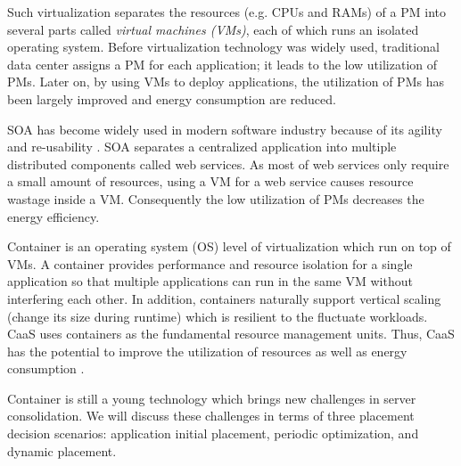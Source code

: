  Such virtualization separates the resources (e.g. CPUs and RAMs) of a PM into several parts called \emph{virtual machines (VMs)}, each of which runs an isolated operating system. Before virtualization technology was widely used, traditional data center assigns a PM for each application; it leads to the low utilization of PMs. Later on, by using VMs to deploy applications, the utilization of PMs has been largely improved and energy consumption are reduced. 

 SOA has become widely used in modern software industry because of its agility and re-usability \cite{Sprott:2004wt}. SOA separates a centralized application into multiple distributed components called web services. As most of web services only require a small amount of resources,  using a VM for a web service causes resource wastage inside a VM. Consequently the low utilization of PMs decreases the energy efficiency. 


 Container is an operating system (OS) level of virtualization which run on top of VMs. A container provides performance and resource isolation for a single application so that multiple applications can run in the same VM without interfering each other. In addition, containers naturally support vertical scaling (change its size during runtime)\cite{Vaquero:2011gb} which is resilient to the fluctuate workloads.  CaaS uses containers as the fundamental resource management units. Thus, CaaS has the potential to improve the utilization of resources as well as energy consumption \cite{Esposito:2016br}. 







Container is still a young technology which brings new challenges in server consolidation. We will discuss these challenges in terms of three placement decision scenarios: application initial placement, periodic optimization, and dynamic placement.

